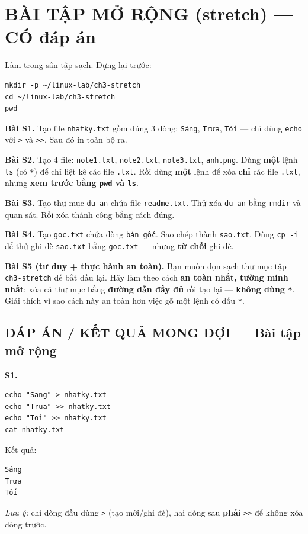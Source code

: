 \documentclass[12pt,a4paper]{article}
\newcommand{\cmd}[1]{\texttt{#1}}
\begin{document}
\section{BÀI TẬP MỞ RỘNG (stretch) --- CÓ đáp án}

Làm trong sân tập sạch. Dựng lại trước:
\begin{Verbatim}
mkdir -p ~/linux-lab/ch3-stretch
cd ~/linux-lab/ch3-stretch
pwd
\end{Verbatim}

\textbf{Bài S1.} Tạo file \cmd{nhatky.txt} gồm đúng 3 dòng: \cmd{Sáng}, \cmd{Trưa}, \cmd{Tối} --- chỉ dùng \cmd{echo} với \cmd{>} và \cmd{>>}. Sau đó in toàn bộ ra.

\textbf{Bài S2.} Tạo 4 file: \cmd{note1.txt}, \cmd{note2.txt}, \cmd{note3.txt}, \cmd{anh.png}. Dùng \textbf{một} lệnh \cmd{ls} (có \cmd{*}) để chỉ liệt kê các file \cmd{.txt}. Rồi dùng \textbf{một} lệnh để xóa \textbf{chỉ} các file \cmd{.txt}, nhưng \textbf{xem trước bằng \cmd{pwd} và \cmd{ls}}.

\textbf{Bài S3.} Tạo thư mục \cmd{du-an} chứa file \cmd{readme.txt}. Thử xóa \cmd{du-an} bằng \cmd{rmdir} và quan sát. Rồi xóa thành công bằng cách đúng.

\textbf{Bài S4.} Tạo \cmd{goc.txt} chứa dòng \cmd{bản gốc}. Sao chép thành \cmd{sao.txt}. Dùng \cmd{cp -i} để thử ghi đè \cmd{sao.txt} bằng \cmd{goc.txt} --- nhưng \textbf{từ chối} ghi đè.

\textbf{Bài S5 (tư duy + thực hành an toàn).} Bạn muốn dọn sạch thư mục tập \cmd{ch3-stretch} để bắt đầu lại. Hãy làm theo cách \textbf{an toàn nhất, tường minh nhất}: xóa cả thư mục bằng \textbf{đường dẫn đầy đủ} rồi tạo lại --- \textbf{không dùng \cmd{*}}. Giải thích vì sao cách này an toàn hơn việc gõ một lệnh có dấu \cmd{*}.

\subsection*{ĐÁP ÁN / KẾT QUẢ MONG ĐỢI --- Bài tập mở rộng}

\textbf{S1.}
\begin{Verbatim}
echo "Sang" > nhatky.txt
echo "Trua" >> nhatky.txt
echo "Toi" >> nhatky.txt
cat nhatky.txt
\end{Verbatim}
Kết quả:
\begin{Verbatim}
Sáng
Trưa
Tối
\end{Verbatim}
\textit{Lưu ý:} chỉ dòng đầu dùng \cmd{>} (tạo mới/ghi đè), hai dòng sau \textbf{phải} \cmd{>>} để không xóa dòng trước.
\end{document}
